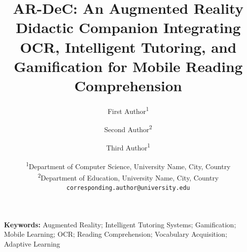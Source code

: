 \documentclass[12pt]{article}
\begin{document}
\title{AR-DeC: An Augmented Reality Didactic Companion Integrating OCR, Intelligent Tutoring, and Gamification for Mobile Reading Comprehension}

\author{
    First Author\textsuperscript{1} \and
    Second Author\textsuperscript{2} \and
    Third Author\textsuperscript{1}
}

\date{
    \textsuperscript{1}Department of Computer Science, University Name, City, Country \\
    \textsuperscript{2}Department of Education, University Name, City, Country \\[1em]
    \texttt{corresponding.author@university.edu}
}

\maketitle



\medskip
\noindent\textbf{Keywords:} Augmented Reality; Intelligent Tutoring Systems; Gamification; Mobile Learning; OCR; Reading Comprehension; Vocabulary Acquisition; Adaptive Learning













\end{document}
